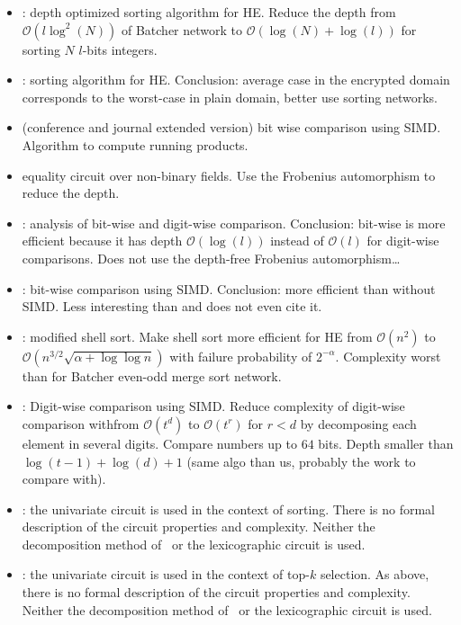 \begin{itemize}
\item \cite{CDSS15}: depth optimized sorting algorithm for HE. Reduce the depth from $\mathcal{O}(l\log^2(N))$ of Batcher network to $\mathcal{O}(\log(N) + \log(l))$ for sorting $N$ $l$-bits integers.

\item \cite{EGNS15}: sorting algorithm for HE. Conclusion: average case in the encrypted domain corresponds to the worst-case in plain domain, better use sorting networks.

\item \cite{CKK15,CKK16} (conference and journal extended version) bit wise comparison using SIMD. Algorithm to compute running products.

\item \cite{KLLW18} equality circuit over non-binary fields. Use the Frobenius automorphism to reduce the depth. 
  
\item \cite{NGEG17}: analysis of bit-wise and digit-wise comparison. Conclusion: bit-wise is more efficient because it has depth $\mathcal{O}(\log(l))$ instead of $\mathcal{O}(l)$ for digit-wise comparisons. Does not use the depth-free Frobenius automorphism\dots

\item \cite{JS19}: bit-wise comparison using SIMD. Conclusion: more efficient than without SIMD. Less interesting than \cite{CKK15} and does not even cite it.
 
\item \cite{LKN19}: modified shell sort. Make shell sort more efficient for HE from $\mathcal{O}(n^2)$ to $\mathcal{O}(n^{3/2}\sqrt{\alpha+\log\log n})$ with failure probability of $2^{-\alpha}$. Complexity worst than for Batcher even-odd merge sort network.

\item \cite{TLWRK20}: Digit-wise comparison using SIMD. Reduce complexity of digit-wise comparison withfrom $\mathcal{O}(t^{d})$ to $\mathcal{O}(t^{r})$ for $r < d$ by decomposing each element in several digits. Compare numbers up to $64$ bits. Depth smaller than $\log(t-1) + \log(d) + 1$ (same algo than us, probably the work to compare with).

\item \cite{AINA:NGEG17}: the univariate circuit is used in the context of sorting. There is no formal description of the circuit properties and complexity. Neither the decomposition method of~\cite{TLWRK20} or the lexicographic circuit is used.

\item \cite{PoPETS:SFR20}: the univariate circuit is used in the context of top-$k$ selection. As above, there is no formal description of the circuit properties and complexity. Neither the decomposition method of~\cite{TLWRK20} or the lexicographic circuit is used.
\end{itemize}


  
